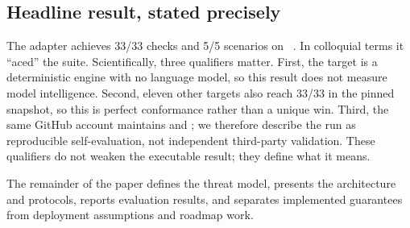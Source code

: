 \subsection{Headline result, stated precisely}

The \system{} adapter achieves 33/33 checks and 5/5 scenarios on \benchmark{}~\cite{memorystackbench2026}. In colloquial terms it ``aced'' the suite. Scientifically, three qualifiers matter. First, the target is a deterministic engine with no language model, so this result does not measure model intelligence. Second, eleven other targets also reach 33/33 in the pinned snapshot, so this is perfect conformance rather than a unique win. Third, the same GitHub account maintains \system{} and \benchmark; we therefore describe the run as reproducible self-evaluation, not independent third-party validation. These qualifiers do not weaken the executable result; they define what it means.

The remainder of the paper defines the threat model, presents the architecture and protocols, reports evaluation results, and separates implemented guarantees from deployment assumptions and roadmap work.
